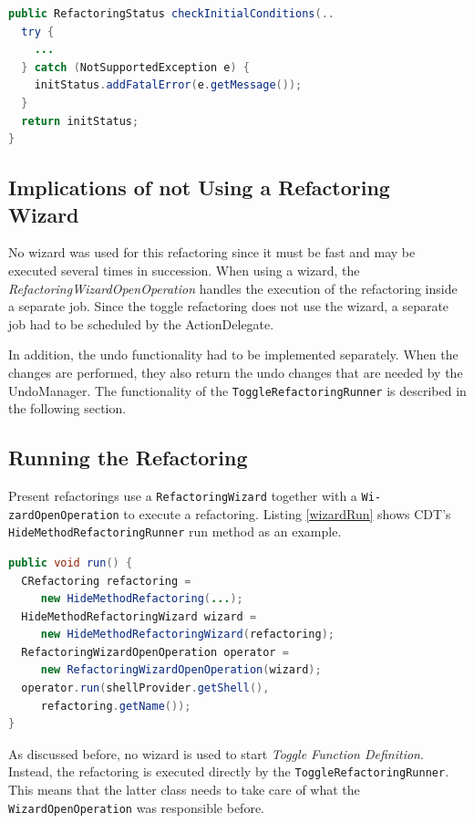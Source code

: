 \begin{lstlisting}[caption={checkInitialConditions(...) forwarding an exception},
label={catchNotSupp}, language=Java]
public RefactoringStatus checkInitialConditions(..
  try {
    ...
  } catch (NotSupportedException e) {
    initStatus.addFatalError(e.getMessage());
  }
  return initStatus;
}
\end{lstlisting}


\subsection{Implications of not Using a Refactoring Wizard}
No wizard was used for this refactoring since it must be fast and may be 
executed several times in succession. When using a wizard, the 
\textit{RefactoringWizardOpenOperation} handles the execution of the refactoring 
inside a separate job. Since the toggle refactoring does not use the wizard, a 
separate job had to be scheduled by the ActionDelegate.

In addition, the undo functionality had to be implemented separately. When the 
changes are performed, they also return the undo changes that are needed by the
UndoManager. The functionality of the \texttt{ToggleRefactoringRunner} is
described in the following section.

\subsection{Running the Refactoring}\label{runnersec}
Present refactorings use a \texttt{RefactoringWizard} together with a 
\texttt{Wi- zardOpenOperation} to execute a refactoring. Listing \ref{wizardRun} 
shows CDT's \texttt{HideMethodRefactoringRunner} run method as an example.

\begin{lstlisting}[caption={shorted run method of HideMethodRefactoringRunner},label={wizardRun}, language=Java]
public void run() {
  CRefactoring refactoring = 
     new HideMethodRefactoring(...);
  HideMethodRefactoringWizard wizard = 
     new HideMethodRefactoringWizard(refactoring);
  RefactoringWizardOpenOperation operator = 
     new RefactoringWizardOpenOperation(wizard);
  operator.run(shellProvider.getShell(), 
     refactoring.getName());
}
\end{lstlisting}

As discussed before, no wizard is used to start \textit{Toggle Function 
Definition}. Instead, the refactoring is executed directly by the 
\texttt{ToggleRefactoringRunner}. This means that the latter class needs to take 
care of what the \texttt{WizardOpenOperation} was responsible before.

